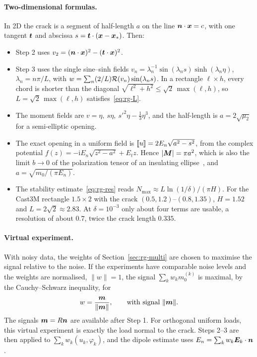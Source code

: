 \paragraph{Two-dimensional formulas.} In 2D the crack is a segment of half-length $a$ on the line $\bm{n}\cdot\bm{x}=c$, with one tangent $\bm{t}$ and abscissa $s=\bm{t}\cdot(\bm{x}-\bm{x}_*)$. Then:
\begin{itemize}[itemsep=2pt]
\item Step 2 uses $v_2=(\bm{n}\cdot\bm{x})^2-(\bm{t}\cdot\bm{x})^2$.
\item Step 3 uses the single sine--sinh fields $v_n=\lambda_n^{-1}\sin(\lambda_ns)\sinh(\lambda_n\eta)$, $\lambda_n=n\pi/L$, with $w=\sum_n(2/L)\mathcal{R}(v_n)\sin(\lambda_ns)$. In a rectangle $\ell\times h$, every chord is shorter than the diagonal $\sqrt{\ell^2+h^2}\le\sqrt{2}\,\max(\ell,h)$, so $L=\sqrt{2}\,\max(\ell,h)$ satisfies~\eqref{eq:rg-L}.
\item The moment fields are $v=\eta,\ s\eta,\ s'^2\eta-\tfrac13\eta^3$, and the half-length is $a=2\sqrt{\mu_2}$ for a semi-elliptic opening.
\item The exact opening in a uniform field is $[\![u]\!]=2E_n\sqrt{a^2-s^2}$, from the complex potential $f(z)=-\mathrm iE_n\sqrt{z^2-a^2}+E_tz$. Hence $|\bm{M}|=\pi a^2$, which is also the limit $b\to0$ of the polarization tensor of an insulating ellipse~\cite{AK04}, and $a=\sqrt{m_0/(\pi E_n)}$.
\item The stability estimate~\eqref{eq:rg-res} reads $N_{\max}\approx L\ln(1/\delta)/(\pi H)$. For the Cast3M rectangle $1.5\times2$ with the crack $(0.5,1.2)$--$(0.8,1.35)$, $H=1.52$ and $L=2\sqrt2\approx2.83$. At $\delta=10^{-3}$ only about four terms are usable, a resolution of about $0.7$, twice the crack length $0.335$.
\end{itemize}

\paragraph{Virtual experiment.} With noisy data, the weights of Section~\ref{sec:rg-multi} are chosen to maximise the signal relative to the noise. If the experiments have comparable noise levels and the weights are normalised, $\|w\|=1$, the signal $\sum_kw_km_0^{(k)}$ is maximal, by the Cauchy--Schwarz inequality, for
\[
w=\frac{\bm{m}}{\|\bm{m}\|},\qquad\text{with signal }\|\bm{m}\| .
\]
The signals $\bm{m}=R\bm{n}$ are available after Step 1. For orthogonal uniform loads, this virtual experiment is exactly the load normal to the crack. Steps 2--3 are then applied to $\sum_kw_k(u_k,\varphi_k)$, and the dipole estimate uses $E_n=\sum_kw_k\bm{E}_k\cdot\bm{n}$.


